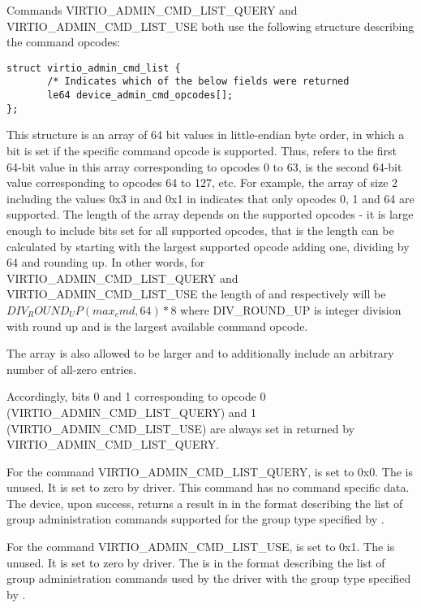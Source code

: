 Commands VIRTIO_ADMIN_CMD_LIST_QUERY and
VIRTIO_ADMIN_CMD_LIST_USE
both use the following structure describing the
command opcodes:

\begin{lstlisting}
struct virtio_admin_cmd_list {
       /* Indicates which of the below fields were returned
       le64 device_admin_cmd_opcodes[];
};
\end{lstlisting}

This structure is an array of 64 bit values in little-endian byte
order, in which a bit is set if the specific command opcode
is supported. Thus,  refers to the
first 64-bit value in this array corresponding to opcodes 0 to
63,  is the second 64-bit value
corresponding to opcodes 64 to 127, etc.
For example, the array of size 2 including
the values 0x3 in 
and 0x1 in  indicates that only
opcodes 0, 1 and 64 are supported.
The length of the array depends on the supported opcodes - it is
large enough to include bits set for all supported opcodes,
that is the length can be calculated by starting with the largest
supported opcode adding one, dividing by 64 and rounding up.
In other words, for
VIRTIO_ADMIN_CMD_LIST_QUERY and VIRTIO_ADMIN_CMD_LIST_USE the
length of  and
 respectively will be
$DIV_ROUND_UP(max_cmd, 64) * 8$ where DIV_ROUND_UP is integer division
with round up and  is the largest available command opcode.

The array is also allowed to be larger and to additionally
include an arbitrary number of all-zero entries.

Accordingly, bits 0 and 1 corresponding to opcode 0
(VIRTIO_ADMIN_CMD_LIST_QUERY) and 1
(VIRTIO_ADMIN_CMD_LIST_USE) are
always set in  returned by VIRTIO_ADMIN_CMD_LIST_QUERY.

For the command VIRTIO_ADMIN_CMD_LIST_QUERY,  is set to 0x0.
The  is unused. It is set to zero by driver.
This command has no command specific data.
The device, upon success, returns a result in
 in the format
 describing the
list of group administration commands supported for the group type
specified by .

For the command VIRTIO_ADMIN_CMD_LIST_USE, 
is set to 0x1.
The  is unused. It is set to zero by driver.
The  is in the format
 describing the
list of group administration commands used by the driver
with the group type specified by .

